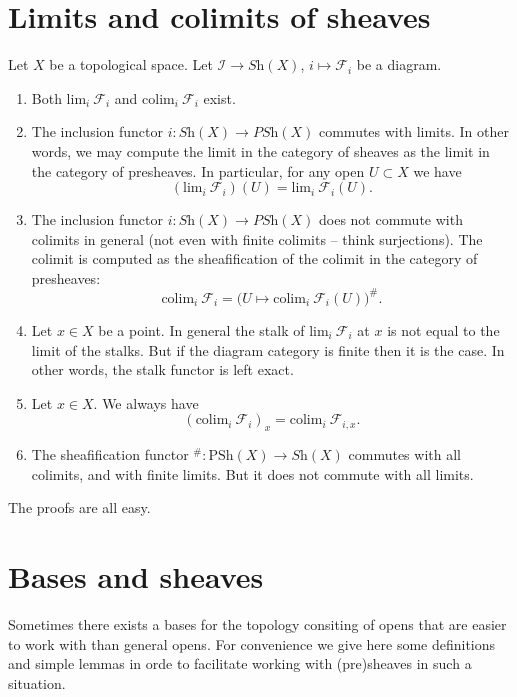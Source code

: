 \section{Limits and colimits of sheaves}
\label{section-limits-sheaves}

\noindent
Let $X$ be a topological space.
Let $\mathcal{I} \to \textit{Sh}(X)$, $i \mapsto \mathcal{F}_i$
be a diagram.
\begin{enumerate}
\item Both $\text{lim}_i\ \mathcal{F}_i$ and $\text{colim}_i\ \mathcal{F}_i$
exist.
\item The inclusion functor $i : \textit{Sh}(X) \to \textit{PSh}(X)$
commutes with limits. In other words, we may compute the limit
in the category of sheaves as the limit in the category of
presheaves. In particular, for any open $U \subset X$ we have
$$
(\text{lim}_i\ \mathcal{F}_i)(U) = \text{lim}_i\ \mathcal{F}_i(U).
$$
\item The inclusion functor $i : \textit{Sh}(X) \to \textit{PSh}(X)$
does not commute with colimits in general (not even
with finite colimits -- think surjections). The colimit is
computed as the sheafification of the colimit in the
category of presheaves:
$$
\text{colim}_i\ \mathcal{F}_i =
\Big(U \mapsto \text{colim}_i\ \mathcal{F}_i(U)\Big)^\#.
$$
\item Let $x \in X$ be a point. In general the stalk of
$\text{lim}_i\ \mathcal{F}_i$ at $x$ is not equal to
the limit of the stalks. But if the diagram category is finite
then it is the case. In other words, the stalk functor is
left exact.
\item Let $x \in X$. We always have
$$
(\text{colim}_i\ \mathcal{F}_i)_x = \text{colim}_i\ \mathcal{F}_{i,x}.
$$
\item The sheafification functor
${}^\# : \text{PSh}(X) \to \textit{Sh}(X)$ commutes with all
colimits, and with finite limits. But it does not commute
with all limits.
\end{enumerate}
The proofs are all easy.


\section{Bases and sheaves}
\label{section-bases}

\noindent
Sometimes there exists a bases for the topology
consiting of opens that are easier to work with
than general opens. For convenience we give here
some definitions and simple lemmas in orde to
facilitate working with (pre)sheaves in such a situation.


